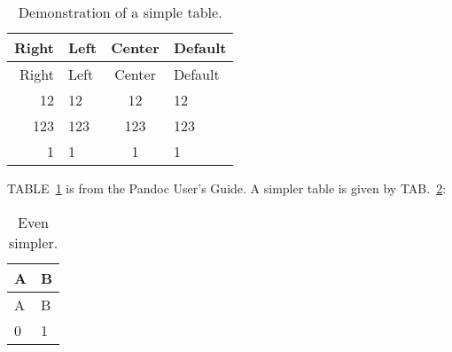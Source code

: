 \begin{longtable}[]{@{}rlcl@{}}
\caption{Demonstration of a simple table. \label{tbl:1}}\tabularnewline
\toprule
Right & Left & Center & Default\tabularnewline
\midrule
\endfirsthead
\toprule
Right & Left & Center & Default\tabularnewline
\midrule
\endhead
12 & 12 & 12 & 12\tabularnewline
123 & 123 & 123 & 123\tabularnewline
1 & 1 & 1 & 1\tabularnewline
\bottomrule
\end{longtable}

\providecommand{\crefformat}[2]{}{}
\providecommand{\Crefformat}[2]{}{}
\crefformat{table}{TAB.~#2#1#3}
\Crefformat{table}{TABLE~#2#1#3}

\providecommand{\plusnamesingular}{}
\providecommand{\starnamesingular}{}
\providecommand{\cref}{\plusnamesingular~\ref}
\providecommand{\Cref}{\starnamesingular~\ref}

\renewcommand{\starnamesingular}{TABLE}\Cref{tbl:1} is from the Pandoc
User's Guide. A simpler table is given by
\renewcommand{\plusnamesingular}{TAB.}\cref{tbl:2}:

\begin{longtable}[]{@{}ll@{}}
\caption{Even simpler. \label{tbl:2}}\tabularnewline
\toprule
A & B\tabularnewline
\midrule
\endfirsthead
\toprule
A & B\tabularnewline
\midrule
\endhead
0 & 1\tabularnewline
\bottomrule
\end{longtable}
